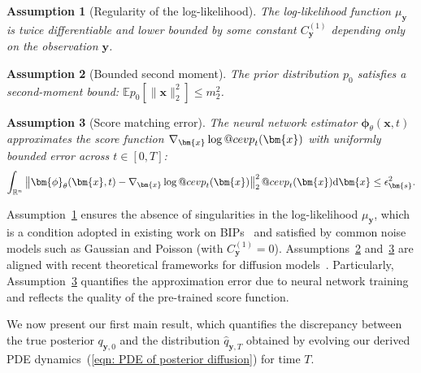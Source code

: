 \documentclass{article}
\makeatletter
\numberwithin{equation}{section}
\newtheorem{assumption}{Assumption}[section]
\def\eqref#1{(\ref{#1})}
\newcommand{\dif}{{\mathrm{d}}}
\def\vs{{\bm{s}}}
\def\vx{{\bm{x}}}
\def\vy{{\bm{y}}}
\def\vphi{{\bm{\phi}}}
\DeclareRobustCommand{\cev}[1]{%
  {\mathpalette\do@cev{#1}}%
}
\newcommand{\do@cev}[2]{%
  \vbox{\offinterlineskip
    \sbox\z@{$\m@th#1 x$}%
    \ialign{##\cr
      \hidewidth\reflectbox{$\m@th#1\vec{}\mkern4mu$}\hidewidth\cr
      \noalign{\kern-\ht\z@}
      $\m@th#1#2$\cr
    }%
  }%
}
\makeatother
\begin{document}
\begin{assumption}[Regularity of the log-likelihood]
\label{assump: regularity and boundedness of log-likelihood}
The log-likelihood function $\mu_{\vy}$ is twice differentiable and lower bounded by some constant $C^{(1)}_{\vy}$  depending only on the observation $\vy$.     
\end{assumption}


\begin{assumption}[Bounded second moment]
\label{assump: bounded second moment}
The prior distribution $p_0$ satisfies a second-moment bound: $\mathbb{E}{p_0}\left[\|\vx\|_{2}^2\right] \leq m_2^2$.
\end{assumption}


\begin{assumption}[Score matching error]
\label{assump: score matching training error}
The neural network estimator $\vphi_{\theta}(\vx,t)$ approximates the score function $\nabla_{\vx}\log \cev{p}_t(\vx)$ with uniformly bounded error across $t \in [0,T]$:
$$
    \int_{\mathbb{R}^n}\left\|\vphi_{\theta}(\vx,t)-\nabla_{\vx}\log \cev{p}_{t}(\vx)\right\|_{2}^2\cev{p}_t(\vx)\dif \vx  \leq \epsilon_{\vs}^2.
$$
\end{assumption}

Assumption~\ref{assump: regularity and boundedness of log-likelihood} ensures the absence of singularities in the log-likelihood $\mu_{\vy}$, which is a condition  adopted in existing work on BIPs~\cite{stuart2010inverse} and satisfied by common noise models such as Gaussian and Poisson (with $C^{(1)}_{\vy} = 0$). Assumptions~\ref{assump: bounded second moment} and~\ref{assump: score matching training error} are aligned with recent theoretical frameworks for diffusion models~\cite{wang2024evaluating,chen2022sampling,chen2023improved,benton2023linear,chen2024probability}. Particularly, Assumption~\ref{assump: score matching training error} quantifies the approximation error due to neural network training and reflects the quality of the pre-trained score function.

We now present our first main result, which quantifies the discrepancy between the true posterior $q_{\vy,0}$ and the distribution $\widehat{q}_{\vy,T}$ obtained by evolving our derived PDE dynamics~\eqref{eqn: PDE of posterior diffusion} for time $T$.
\end{document}
